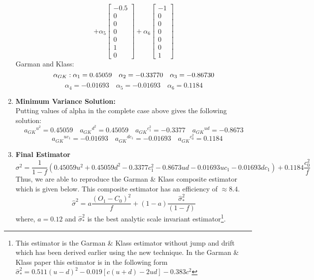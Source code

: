 \documentclass[12pt]{article}   	%
\begin{document}
\begin{enumerate}
$$+\alpha_5
\begin{bmatrix}
-0.5\\
0\\
0\\
0\\
0\\
1\\
0
\end{bmatrix}
+\alpha_6
\begin{bmatrix}
-1\\
0\\
0\\
0\\
0\\
0\\
1
\end{bmatrix}
 $$
Garman and Klass:\quad $$\alpha_{GK}: \alpha_1=0.45059\quad \alpha_2=-0.33770\quad \alpha_3=-0.86730 \quad\\$$ $$
 \alpha_4=-0.01693\quad \alpha_5=-0.01693 \quad \alpha_6=0.1184$$ 
 
\item \textbf{Minimum Variance Solution:}\\
Putting values of alpha in the complete case above gives the following solution:\\
$${a_{GK}}^{u^2}=0.45059\quad{a_{GK}}^{d^2}=0.45059\quad{a_{GK}}^{c_1^2}= -0.3377\quad{a_{GK}}^{ud}=-0.8673$$
$$\quad{a_{GK}}^{uc_1}=-0.01693\quad{a_{GK}}^{dc_1}=-0.01693\quad{a_{GK}}^{c_0^2}=0.1184$$

\item \textbf{Final Estimator}\\
$$\sigma^{2}= \frac{1}{1-f}(0.45059{u^2}+0.45059d^2-0.3377c_{1}^2-0.8673ud-0.01693uc_{1}-0.01693dc_{1})+ 0.1184\frac{c_{0}^2}{f}$$
Thus, we are able to reproduce the Garman \& Klass composite estimator which is given below. This composite estimator has an efficiency of $\approx 8.4.$
$$\hat{\sigma}^2=a\frac{(O_1-C_0)^2}{f}+(1-a)\frac{\hat{\sigma}_*^2}{(1-f)}
$$
where, $a=0.12$ and $\hat{\sigma}_*^2$ is the best analytic scale invariant estimator\footnote{This estimator is the Garman \& Klass estimator without jump and drift which has been derived earlier using the new technique. In the Garman \& Klass paper this estimator is in the following form $\hat{\sigma}_*^2 = 0.511(u-d)^2-0.019[c(u+d)-2ud]-0.383c^2$}. 
\end{enumerate}
\end{document}
